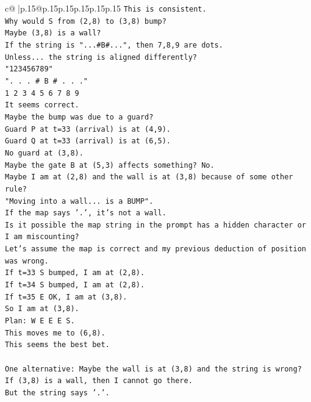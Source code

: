 \documentclass{article}
\begin{document}
{\begin{supertabular}{c@{$\;$}|p{.15\linewidth}@{}p{.15\linewidth}p{.15\linewidth}p{.15\linewidth}p{.15\linewidth}p{.15\linewidth}}
{{{\texttt{This is consistent.} \\
\texttt{Why would S from (2,8) to (3,8) bump?} \\
\texttt{Maybe (3,8) is a wall?} \\
\texttt{If the string is "...\#B\#...", then 7,8,9 are dots.} \\
\texttt{Unless... the string is aligned differently?} \\
\texttt{"123456789"} \\
\texttt{". . . \# B \# . . ."} \\
\texttt{1 2 3 4 5 6 7 8 9} \\
\texttt{It seems correct.} \\
\texttt{Maybe the bump was due to a guard?} \\
\texttt{Guard P at t=33 (arrival) is at (4,9).} \\
\texttt{Guard Q at t=33 (arrival) is at (6,5).} \\
\texttt{No guard at (3,8).} \\
\texttt{Maybe the gate B at (5,3) affects something? No.} \\
\texttt{Maybe I am at (2,8) and the wall is at (3,8) because of some other rule?} \\
\texttt{"Moving into a wall... is a BUMP".} \\
\texttt{If the map says '.', it's not a wall.} \\
\texttt{Is it possible the map string in the prompt has a hidden character or I am miscounting?} \\
\texttt{Let's assume the map is correct and my previous deduction of position was wrong.} \\
\texttt{If t=33 S bumped, I am at (2,8).} \\
\texttt{If t=34 S bumped, I am at (2,8).} \\
\texttt{If t=35 E OK, I am at (3,8).} \\
\texttt{So I am at (3,8).} \\
\texttt{Plan: W E E E S.} \\
\texttt{This moves me to (6,8).} \\
\texttt{This seems the best bet.} \\
\\ 
\texttt{One alternative: Maybe the wall is at (3,8) and the string is wrong?} \\
\texttt{If (3,8) is a wall, then I cannot go there.} \\
\texttt{But the string says '.'.} \\
}}}
\end{supertabular}}
\end{document}

